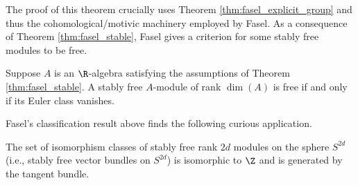 The proof of this theorem crucially uses Theorem \ref{thm:fasel_explicit_group} and thus the cohomological/motivic machinery employed by Fasel. As a consequence of Theorem \ref{thm:fasel_stable}, Fasel gives a criterion for some stably free modules to be free. 

\begin{theorem}\cite[Theorem 5.10]{Fasel_2010}
    Suppose $A$ is an $\R$-algebra satisfying the assumptions of Theorem \ref{thm:fasel_stable}. A stably free $A$-module of rank $\dim(A)$ is free if and only if its Euler class vanishes.
\end{theorem}

Fasel's classification result above finds the following curious application. 

\begin{corollary}\cite[Corollary 5.12]{Fasel_2010}
    The set of isomorphism classes of stably free rank $2d$ modules on the sphere $S^{2d}$ (i.e., stably free vector bundles on $S^{2d}$) is isomorphic to $\Z$ and is generated by the tangent bundle. 
\end{corollary}
